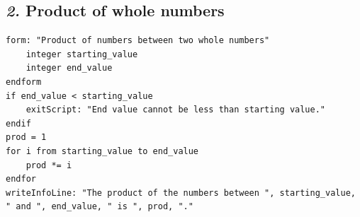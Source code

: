 \documentclass[12pt, english]{article}
\begin{document}
\subsection*{\emph{2.} Product of whole numbers}

\begin{lstlisting}
form: "Product of numbers between two whole numbers"
	integer starting_value
	integer end_value
endform
if end_value < starting_value
	exitScript: "End value cannot be less than starting value."
endif
prod = 1
for i from starting_value to end_value
    prod *= i
endfor
writeInfoLine: "The product of the numbers between ", starting_value, " and ", end_value, " is ", prod, "."
\end{lstlisting}


\newpage
\end{document}
